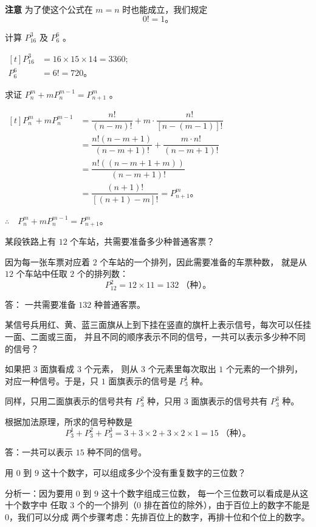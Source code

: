 \textbf{注意} \quad 为了使这个公式在 $m = n$ 时也能成立，我们规定
$$ 0! = 1 \text{。} $$

\liti 计算 $P_{16}^3$ 及 $P_6^6$ 。

\jie \quad $\begin{aligned}[t]
    P_{16}^3 &= 16 \times 15 \times 14 = 3360; \\
    P_6^6 &= 6! = 720 \text{。}
\end{aligned}$


\liti 求证 $P_n^m + m P_n^{m-1} = P_{n+1}^m$ 。

\zhengming $\begin{aligned}[t]
    P_n^m + m P_n^{m-1} &= \dfrac{n!}{(n-m)!} + m \cdot \dfrac{n!}{[n - (m-1)]!} \\
        &= \dfrac{n! (n-m+1)}{(n-m+1)!} + \dfrac{m \cdot n!}{(n-m+1)!} \\
        &= \dfrac{n! ((n-m+1+m))}{(n-m+1)!} \\
        &= \dfrac{(n+1)!}{[(n+1)-m]!} = P_{n+1}^m \text{。}
\end{aligned}$

$\therefore \quad P_n^m + m P_n^{m-1} = P_{n+1}^m$。


\liti 某段铁路上有 $12$ 个车站，共需要准备多少种普通客票？

\jie 因为每一张车票对应着 $2$ 个车站的一个排列，因此需要准备的车票种数，
就是从 $12$ 个车站中任取 $2$ 个的排列数：
$$ P_{12}^2 = 12 \times 11 = 132 \; \text{（种）。} $$

答： 一共需要准备 $132$ 种普通客票。


\liti 某信号兵用红、黄、蓝三面旗从上到下挂在竖直的旗杆上表示信号，每次可以任挂一面、二面或三面，
并且不同的顺序表示不同的信号，一共可以表示多少种不同的信号？

\jie 如果把 $3$ 面旗看成 $3$ 个元素， 则从 $3$ 个元素里每次取出 $1$ 个元素的一个排列，
对应一种信号。于是，只 $1$ 面旗表示的信号是 $P_3^1$ 种。

同样，只用二面旗表示的信号共有 $P_3^2$ 种，只用 $3$ 面旗表示的信号共有 $P_3^3$ 种。

根据加法原理，所求的信号种数是
$$ P_3^1 + P_3^2 + P_3^3 = 3 + 3 \times 2 + 3 \times 2 \times 1 = 15 \; \text{（种）。} $$

答：一共可以表示 $15$ 种不同的信号。


\liti 用 $0$ 到 $9$ 这十个数字，可以组成多少个没有重复数字的三位数？

分析一：因为要用 $0$ 到 $9$ 这十个数字组成三位数， 每一个三位数可以看成是从这十个数字中
任取 $3$ 个的一个排列（$0$ 排在首位的除外），由于百位上的数字不能是 $0$，我们可以分成
两个步骤考虑：先排百位上的数字，再排十位和个位上的数字。

